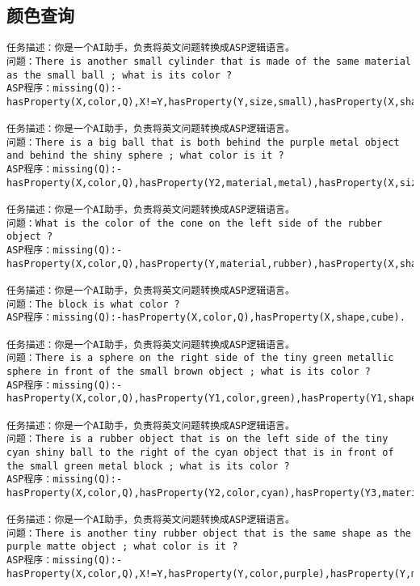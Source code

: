 \subsection{颜色查询}
\begin{lstlisting}
任务描述：你是一个AI助手，负责将英文问题转换成ASP逻辑语言。
问题：There is another small cylinder that is made of the same material as the small ball ; what is its color ? 
ASP程序：missing(Q):-hasProperty(X,color,Q),X!=Y,hasProperty(Y,size,small),hasProperty(X,shape,cylinder),hasProperty(Y,shape,sphere),hasProperty(X,size,small),same_material(Y,X).

任务描述：你是一个AI助手，负责将英文问题转换成ASP逻辑语言。
问题：There is a big ball that is both behind the purple metal object and behind the shiny sphere ; what color is it ? 
ASP程序：missing(Q):-hasProperty(X,color,Q),hasProperty(Y2,material,metal),hasProperty(X,size,large),hasProperty(Y1,material,metal),hasProperty(X,shape,sphere),hasProperty(Y1,color,purple),hasProperty(Y2,shape,sphere),behind(Y1,X),behind(Y2,X),X!=Y1,Y1!=Y2,X!=Y2.

任务描述：你是一个AI助手，负责将英文问题转换成ASP逻辑语言。
问题：What is the color of the cone on the left side of the rubber object ? 
ASP程序：missing(Q):-hasProperty(X,color,Q),hasProperty(Y,material,rubber),hasProperty(X,shape,cone),left(Y,X),X!=Y.

任务描述：你是一个AI助手，负责将英文问题转换成ASP逻辑语言。
问题：The block is what color ? 
ASP程序：missing(Q):-hasProperty(X,color,Q),hasProperty(X,shape,cube). 

任务描述：你是一个AI助手，负责将英文问题转换成ASP逻辑语言。
问题：There is a sphere on the right side of the tiny green metallic sphere in front of the small brown object ; what is its color ? 
ASP程序：missing(Q):-hasProperty(X,color,Q),hasProperty(Y1,color,green),hasProperty(Y1,shape,sphere),hasProperty(X,shape,sphere),hasProperty(Y2,size,small),hasProperty(Y1,size,small),hasProperty(Y2,color,brown),hasProperty(Y1,material,metal),right(Y1,X),front(Y2,Y1),X!=Y1,Y1!=Y2,X!=Y2. 

任务描述：你是一个AI助手，负责将英文问题转换成ASP逻辑语言。
问题：There is a rubber object that is on the left side of the tiny cyan shiny ball to the right of the cyan object that is in front of the small green metal block ; what is its color ?
ASP程序：missing(Q):-hasProperty(X,color,Q),hasProperty(Y2,color,cyan),hasProperty(Y3,material,metal),hasProperty(Y3,color,green),hasProperty(Y1,material,metal),hasProperty(Y3,size,small),hasProperty(Y1,color,cyan),hasProperty(Y1,shape,sphere),hasProperty(Y3,shape,cube),hasProperty(X,material,rubber),hasProperty(Y1,size,small),left(Y1,X),right(Y2,Y1),front(Y3,Y2),X!=Y1,Y1!=Y2,Y2!=Y3,X!=Y2,X!=Y3,Y1!=Y3. 

任务描述：你是一个AI助手，负责将英文问题转换成ASP逻辑语言。
问题：There is another tiny rubber object that is the same shape as the purple matte object ; what color is it ? 
ASP程序：missing(Q):-hasProperty(X,color,Q),X!=Y,hasProperty(Y,color,purple),hasProperty(Y,material,rubber),hasProperty(X,material,rubber),hasProperty(X,size,small),same_shape(Y,X). 
\end{lstlisting}

